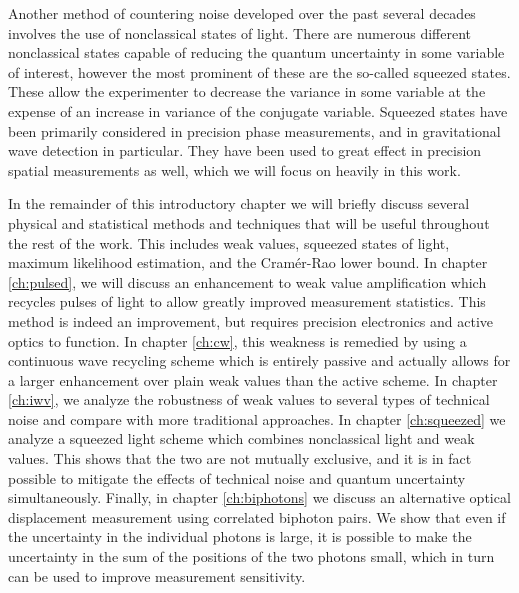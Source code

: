 Another method of countering noise developed over the past several decades involves the use of nonclassical states of light.  There are numerous different nonclassical states capable of reducing the quantum uncertainty in some variable of interest, however the most prominent of these are the so-called squeezed states.  These allow the experimenter to decrease the variance in some variable at the expense of an increase in variance of the conjugate variable.  Squeezed states have been primarily considered in precision phase measurements, and in gravitational wave detection in particular.  They have been used to great effect in precision spatial measurements as well, which we will focus on heavily in this work. 

In the remainder of this introductory chapter we will briefly discuss several physical and statistical methods and techniques that will be useful throughout the rest of the work.  This includes weak values, squeezed states of light, maximum likelihood estimation, and the Cram\'{e}r-Rao lower bound.  In chapter \ref{ch:pulsed}, we will discuss an enhancement to weak value amplification which recycles pulses of light to allow greatly improved measurement statistics.  This method is indeed an improvement, but requires precision electronics and active optics to function.  In chapter \ref{ch:cw}, this weakness is remedied by using a continuous wave recycling scheme which is entirely passive and actually allows for a larger enhancement over plain weak values than the active scheme.  In chapter \ref{ch:iwv}, we analyze the robustness of weak values to several types of technical noise and compare with more traditional approaches.  In chapter \ref{ch:squeezed} we analyze a squeezed light scheme which combines nonclassical light and weak values.  This shows that the two are not mutually exclusive, and it is in fact possible to mitigate the effects of technical noise and quantum uncertainty simultaneously.  Finally, in chapter \ref{ch:biphotons} we discuss an alternative optical displacement measurement using correlated biphoton pairs.  We show that even if the uncertainty in the individual photons is large, it is possible to make the uncertainty in the sum of the positions of the two photons small, which in turn can be used to improve measurement sensitivity.  

